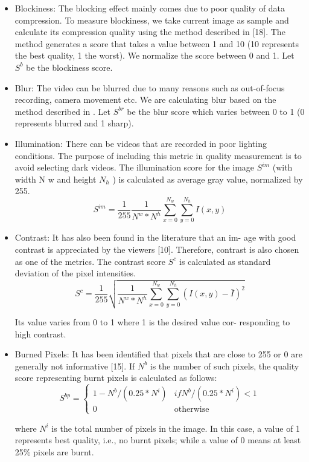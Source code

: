 \documentclass{clsfile}
\begin{document}
\begin{itemize}
\item Blockiness: The blocking effect mainly comes due to poor
quality of data compression. To measure blockiness, we take
current image as sample and calculate its compression quality using the method described in [18]. The method generates
a score that takes a value between 1 and 10 (10 represents the
best quality, 1 the worst). We normalize the score between 0
and 1. Let $S^b$ be the blockiness score.

\item Blur: The video can be blurred due to many reasons such as
out-of-focus recording, camera movement etc. We are calculating blur based on the method described in \cite{hale1977retarded}. Let $S^{br}$
be the blur score which varies between 0 to 1 (0 represents
blurred and 1 sharp).

\item Illumination: There can be videos that are recorded in poor
lighting conditions. The purpose of including this metric in
quality measurement is to avoid selecting dark videos. The
illumination score for the image $S^{im}$ (with width N w and
height $N_h$ ) is calculated as average gray value, normalized
by 255.
\begin{equation}
    S^{im} = \frac{1}{255}\frac{1}{N^w*N^h}\sum_{x=0}^{N_w}\sum_{y=0}^{N_h}{I(x,y)}
\end{equation}

\item Contrast: It has also been found in the literature that an im-
age with good contrast is appreciated by the viewers [10].
Therefore, contrast is also chosen as one of the metrics. The
contrast score $S^c$ is calculated as standard deviation of the
pixel intensities.
\begin{equation}
    S^{c} = \frac{1}{255}\sqrt{\frac{1}{N^w*N^h}\sum_{x=0}^{N_w}\sum_{y=0}^{N_h}{(I(x,y)-\bar{I})^2}}
\end{equation}

Its value varies from 0 to 1 where 1 is the desired value cor-
responding to high contrast.

\item Burned Pixels: It has been identified that pixels that are
close to 255 or 0 are generally not informative [15]. If $N^b$
is the number of such pixels, the quality score representing
burnt pixels is calculated as follows:
\begin{equation}
S^{bp} = 
\begin{cases}
1-N^b/(0.25*N^i) & if N^b/(0.25*N^i)<1\\
0 & \text{otherwise}
\end{cases}
\end{equation}

where $N^i$ is the total number of pixels in the image. In this
case, a value of 1 represents best quality, i.e., no burnt pixels;
while a value of 0 means at least 25\% pixels are burnt.

\end{itemize}
\end{document}
